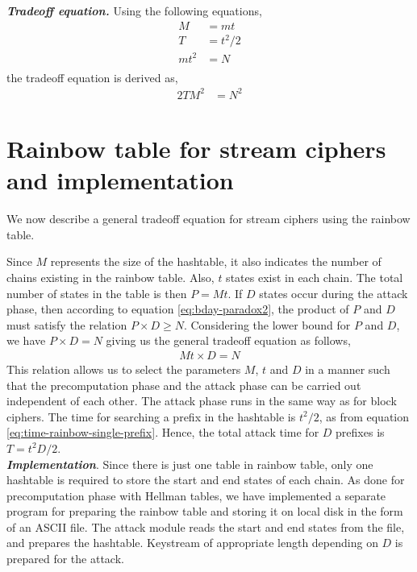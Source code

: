 \noindent \textit{\textbf{Tradeoff equation.}} Using the following equations,
\begin{align*}
M &= mt\\
T &= t^2/2\\
mt^2 &= N\\
\end{align*}
the tradeoff equation is derived as,
\begin{align}
\label{eq:tmdto-rainbow-block} 2TM^2 &= N^2
\end{align}

\section{Rainbow table for stream ciphers and implementation}
\label{sec:rainbow-stream}

We now describe a general tradeoff equation for stream ciphers using the rainbow table.

Since $M$ represents the size of the hashtable, it also indicates the number of chains existing in the rainbow table. Also, $t$ states exist in each chain. The total number of states in the table is then $P = Mt$. If $D$ states occur during the attack phase, then according to equation \ref{eq:bday-paradox2}, the product of $P$ and $D$ must satisfy the relation $P \times D \geq N$. Considering the lower bound for $P$ and $D$, we have $P \times D = N$ giving us the general tradeoff equation as follows,
\begin{align}
\label{eq:general-rainbow-stream} Mt \times D = N
\end{align} 
This relation allows us to select the parameters $M$, $t$ and $D$ in a manner such that the precomputation phase and the attack phase can be carried out independent of each other. The attack phase runs in the same way as for block ciphers. The time for searching a prefix in the hashtable is $t^2/2$, as from equation \ref{eq:time-rainbow-single-prefix}. Hence, the total attack time for $D$ prefixes is $T = t^2D/2$.\\

\noindent \textbf{\textit{Implementation}}. Since there is just one table in rainbow table, only one hashtable is required to store the start and end states of each chain. As done for precomputation phase with Hellman tables, we have implemented a separate program for preparing the rainbow table and storing it on local disk in the form of an ASCII file. The attack module reads the start and end states from the file, and prepares the hashtable. Keystream of appropriate length depending on $D$ is prepared for the attack. 

